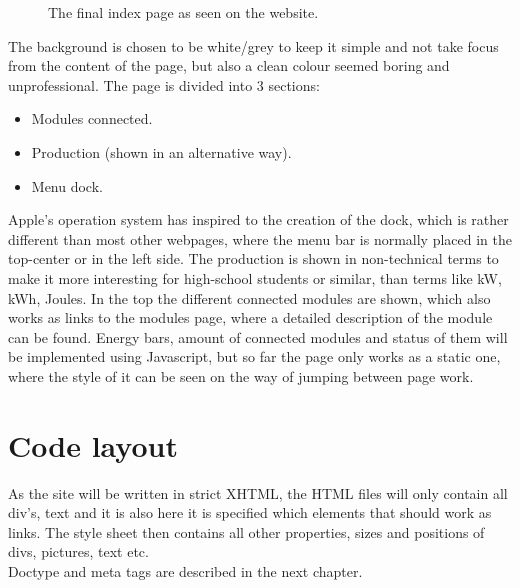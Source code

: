 \begin{figure}[h!]
	\center
		\setlength\fboxsep{0pt}
		\setlength\fboxrule{1pt}
   	\caption{The final index page as seen on the website.}
   	\label{fig:index_page_design}
\end{figure}
The background is chosen to be white/grey to keep it simple and not take focus from the content of the page, but also a clean colour seemed boring and unprofessional.
\newpage The page is divided into 3 sections:
\begin{itemize}
	\item Modules connected.
	\item Production (shown in an alternative way).
	\item Menu dock.
\end{itemize}
Apple's operation system has inspired to the creation of the dock, which is rather different than most other webpages, where the menu bar is normally placed in the top-center or in the left side. The production is shown in non-technical terms to make it more interesting for high-school students or similar, than terms like kW, kWh, Joules. In the top the different connected modules are shown, which also works as links to the modules page, where a detailed description of the module can be found. Energy bars, amount of connected modules and status of them will be implemented using Javascript, but so far the page only works as a static one, where the style of it can be seen on the way of jumping between page work.  
\section{Code layout}
As the site will be written in strict XHTML, the HTML files will only contain all div's, text and it is also here it is specified which elements that should work as links. The style sheet then contains all other properties, sizes and positions of divs, pictures, text etc.
\\Doctype and meta tags are described in the next chapter.

